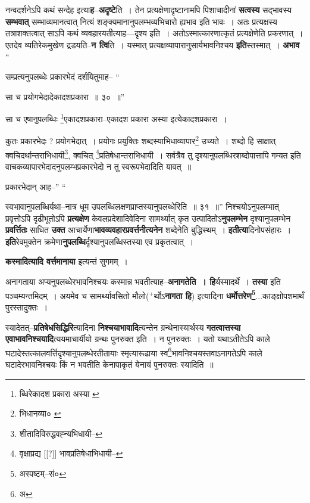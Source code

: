 \documentclass[article,12pt,a4paper]{memoir}
\newcommand{\add}[1]{($^{+}$#1)}
\begin{document}
	  \pstart नन्वदर्शनेऽपि कथं सन्देह इत्या\textbf{ह--अदृष्टे}ति । तेन प्रत्यक्षेणादृष्टानामपि पिशाचादीनां \textbf{सत्वस्य} सद्भावस्य \textbf{सम्भवात्} सम्भाव्यमानत्वात् नित्यं शङ्क्यमानानुपलम्भव्यभिचारो ह्यभाव इति भावः । अतः प्रत्यक्षस्य तत्राशक्तत्वात् साऽपि कथं व्यवहारयतीत्याह—दृश्य इति । अतोऽस्मात्कारणात्कृतं प्रत्यक्षेणेति प्रकरणात् । एतदेव व्यतिरेकमुखेण द्रडयति--\textbf{न त्वि}ति । यस्मात् प्रत्यक्षव्यापारानुसार्यभावनिश्चय \textbf{इति}स्तस्मात् । \textbf{अभाव}  \leavevmode{} “
	  
	सम्प्रत्यनुपलब्धेः प्रकारभेदं दर्शयितुमाह-- “
	  
	सा च प्रयोगभेदादेकादशप्रकारा ॥ ३० ॥” 
	  
	सा च एषानुपलब्धिः \footnote{ब्धिरेकादश प्रकारा अस्या \cite{dp-msA} \cite{dp-edP} \cite{dp-edE}}\-एकादशप्रकारा--एकादश प्रकारा अस्या इत्येकादशप्रकारा । 
	  
	कुतः प्रकारभेदः ? प्रयोगभेदात् । प्रयोगः प्रयुक्तिः शब्दस्याभिधाव्यापार\footnote{भिधानव्या० \cite{dp-msA} \cite{dp-msB} \cite{dp-msC} \cite{dp-msD} \cite{dp-edP} \cite{dp-edH} \cite{dp-edE} \cite{dp-edN}} उच्यते । शब्दो हि साक्षात् क्वचिदर्थान्तराभिधायी\footnote{शीतादिविरुद्धवह्न्यभिधायी--\cite{dp-msD-n}}\-, क्वचित् \footnote{वृक्षाप्रद्य [[?]] भावप्रतिषेधाभिधायी--\cite{dp-msD-n}}\-प्रतिषेधान्तराभिधायी । सर्वत्रैव तु दृश्यानुपलब्धिरशब्दोपात्तापि गम्यत इति वाचकव्यापारभेदादनुपलम्भप्रकारभेदो न तु स्वरूपभेदादिति यावत् ॥ 
	  
	प्रकारभेदान् आह--” “
	  
	स्वभावानुपलब्धिर्यथा--नात्र धूम उपलब्धिलक्षणप्राप्तस्यानुपलब्धेरिति ॥ ३१ ॥” निश्चयोऽनुपलम्भात् प्रवृत्तोऽपि दृढीभूतोऽपि \textbf{प्रत्यक्षेण} केवलप्रदेशादिवेदिना सामर्थ्यात् कृत उत्पादितोऽ\textbf{नुपलम्भेन} दृश्यानुपलम्भेन \textbf{प्रवर्त्तितः} साधित \textbf{उक्त} आचार्येणा\textbf{भावव्यवहारप्रवर्त्तनीत्यनेन} शब्देनेति बुद्धिस्थम् । \textbf{इतीत्या}दिनोपसंहारः । \textbf{इति}रेवमुक्तेन क्रमेणा\textbf{नुपलब्धि}र्दृश्यानुपलब्धिस्तस्या एव प्रकृतत्वात् ।
	\pend
      

	  \pstart \textbf{कस्मादित्यादि वर्त्तमानाया} इत्यन्तं सुगमम् ।
	\pend
      

	  \pstart अनागताया अप्यनुपलब्धेरभावनिश्चयः कस्मान्न भवतीत्याह--\textbf{अनागतेति । हि}र्यस्मादर्थे । \textbf{तस्या} इति पञ्चम्यन्तमिदम् । अयमेव च सामर्थ्यावसितो मौलो\add{र्थोऽ\textbf{नागता हि}} इत्यादिना \textbf{धर्मोत्तरेण\footnote{अस्पष्टम्--सं०}\-}...काङ्क्षोपशमार्थं पुरस्तादुक्तः ।
	\pend
      

	  \pstart स्यादेतत्--\textbf{प्रतिषेधसिद्धिरि}त्यादिना \textbf{निश्चयाभावादि}त्यन्तेन \leavevmode{} ग्रन्थेनास्यार्थस्य \textbf{गतत्वात्तस्या एवाभावनिश्चयादि}त्ययमाचार्यीयो ग्रन्थः पुनरुक्त इति । न पुनरुक्तः । यतो यथाऽतीतेऽपि काले घटादेस्तत्कालवर्त्तिदृश्यानुपलब्धेरतीतायाः स्मृत्यारूढाया स्व\footnote{अ}\-भावनिश्चयस्तवाऽनागतेऽपि काले घटादेरभावनिश्चयः किं न भवतीति केनापाकृतं येनायं पुनरुक्तः स्यादिति ॥
	\pend
      
\end{document}

